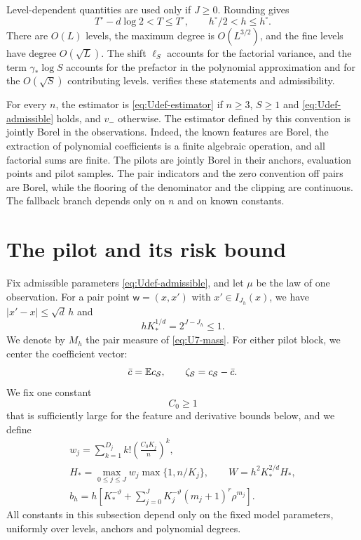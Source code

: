 Level-dependent quantities are used only if $J\ge0$. Rounding gives
\begin{equation}\label{eq:Udef-params-rounding}
 T^\circ-d\log2<T\le T^\circ,\qquad h^\circ/2<h\le h^\circ.
\end{equation}
There are $O(L)$ levels, the maximum degree is $O(L^{3/2})$, and the
fine levels have degree $O(\sqrt L)$. The shift $\ell_S$ accounts for the
factorial variance, and the term $\gamma_*\log S$ accounts for the
prefactor in the polynomial approximation and for the $O(\sqrt S)$
contributing levels.
 verifies these statements and admissibility.

For every $n$, the estimator is \eqref{eq:Udef-estimator} if $n\ge3$,
$S\ge1$
and \eqref{eq:Udef-admissible} holds, and $v_-$ otherwise.
The estimator defined by this convention is jointly Borel in the
observations. Indeed, the known features are Borel, the extraction of
polynomial coefficients is a finite algebraic operation, and all
factorial sums are finite. The pilots are jointly Borel in their
anchors, evaluation points and pilot samples. The pair indicators and
the zero convention off pairs are Borel, while the flooring of the
denominator and the clipping are continuous. The fallback branch
depends only on $n$ and on known constants.
\section{The pilot and its risk bound}\label{sec:U-variance}
\label{sec:U-equation}

Fix admissible parameters \eqref{eq:Udef-admissible}, and let $\mu$
be the law of one observation. For a pair point $\mathsf w=(x,x')$
with $x'\in I_{J_h}(x)$, we have $|x'-x|\le\sqrt d\,h$ and
\begin{equation}\label{eq:U8-hK}
 hK_*^{1/d}=2^{J-J_h}\le1.
\end{equation}
We denote by $M_h$ the pair measure of \eqref{eq:U7-mass}. For either
pilot block, we center the coefficient vector:
\begin{equation}\label{eq:U-pilot-vector}
 \bar c=\mathbb E c_{\mathcal S},\qquad
 \zeta_{\mathcal S}=c_{\mathcal S}-\bar c.
\end{equation}
We fix one constant
\begin{equation}\label{eq:U7-constants}
 C_0\ge1
\end{equation}
that is sufficiently large for the feature and derivative bounds below,
and we define
\begin{gather}
 w_j=\sum_{k=1}^{D_j}k!\left(\frac{C_0K_j}{n}\right)^k,
 \label{eq:U7-w}\\
 H_*=\max_{0\le j\le J}w_j\max\{1,n/K_j\},
 \qquad W=h^2K_*^{2/d}H_*,\label{eq:U7-envelope}\\
 b_h=h\left[K_*^{-\vartheta}
       +\sum_{j=0}^JK_j^{-\vartheta}(m_j+1)^r\rho^{m_j}\right].
 \label{eq:U8-bh}
\end{gather}
All constants in this subsection depend only on the fixed model
parameters, uniformly over levels, anchors and polynomial degrees.

